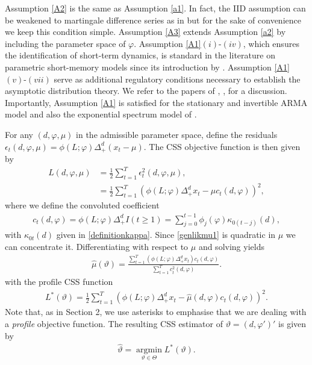 {{Assumption \ref{A2} is the same as Assumption \ref{a1}. In fact, the IID assumption can be weakened to martingale difference series as in \textcite{hualde2020truncated,hualde2021truncated} but for the sake of convenience we keep this
condition simple. Assumption \ref{A3} extends Assumption \ref{a2} by including the parameter space of $\varphi$. Assumption \ref{A1}$(i)$-$(iv)$, which ensures the identification of short-term dynamics, is standard in the
literature on parametric short-memory models since its introduction by \textcite{hannan1973asymptotic}. Assumption \ref{A1}$(v)$-$(vii)$ serve as additional regulatory conditions necessary to establish the asymptotic distribution
theory. We refer to the papers of \textcite{hualde2011gaussian}, \textcite{nielsen2015asymptotics}, \textcite{hualde2020truncated,hualde2021truncated} for a discussion. Importantly, Assumption \ref{A1} is satisfied for the stationary and
invertible ARMA model and also the exponential spectrum model of \textcite{bloomfield1973exponential}.



For any $(d,\varphi,\mu)$ in the admissible parameter space, define the residuals $\epsilon_t(d,\varphi,\mu) =  \phi(L;\varphi) \Delta_+^{d}(x_t-\mu)$. The CSS objective function is then given by 
\begin{align}
    L(d,\varphi,\mu) &= \frac{1}{2} \sum_{t = 1}^T \epsilon^2_t(d,\varphi,\mu), \nonumber \\
                     &=   \frac{1}{2} \sum_{t = 1}^T \left(  \phi(L;\varphi)\Delta_{+}^{d} x_t- \mu c_t(d,\varphi)  \right)^2, \label{genlikmu1}
\end{align}
where we define the convoluted coefficient
\begin{align}
    c_t(d,\varphi) = \phi(L;\varphi)\Delta_{+}^{d}  I(t \geq 1) = \sum_{j = 0}^{t-1} \phi_j(\varphi) \kappa_{0(t-j)}(d), \label{convcoef}
\end{align}
with $\kappa_{0t}(d)$ given in \eqref{definitionkappa}. Since \eqref{genlikmu1} is quadratic in $\mu$ we can concentrate it. Differentiating with respect to $\mu$ and solving yields 
\begin{align}
    \hat{\mu}(\vartheta) = \frac{\sum_{t = 1}^T ( \phi(L;\varphi)\Delta_{+}^{d} x_t)c_t(d,\varphi)}{\sum_{t = 1}^T c^2_t(d,\varphi)}. \label{genmu1}
\end{align}
with the profile CSS function 
\begin{align} 
    L^*(\vartheta) = \frac{1}{2} \sum_{t = 1}^T \left(  \phi(L;\varphi)\Delta_{+}^{d} x_t- \hat{\mu}(d,\varphi) c_t(d,\varphi)  \right)^2. \label{genL1}
\end{align} 
Note that, as in Section 2, we use asterisks to emphasise that we are dealing with a \textit{profile} objective
function. The resulting CSS estimator of $\vartheta = (d,\varphi')'$ is given by
\begin{align}
    \hat{\vartheta} = \operatorname*{argmin}_{\vartheta \in \Theta}  L^*(\vartheta). \label{genCSS}
\end{align}


}}
